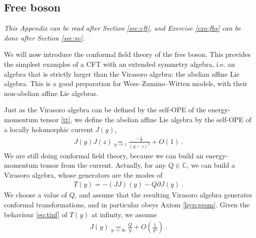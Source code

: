 \documentclass[12pt, a4paper]{article}
\theoremstyle{break}
\begin{document}
\subsection{Free boson}\label{sec:fb}

\textit{This Appendix can be read after Section \ref{sec:cft}, and Exercise \ref{exo:fbs} can be done after Section \ref{sec:sv}.}

\vspace{2mm}

We will now introduce the conformal field theory of the free boson. This provides the simplest examples of a CFT with an extended symmetry algebra, i.e. an algebra that is strictly larger than the Virasoro algebra: the abelian affine Lie algebra. This is a good preparation for Wess--Zumino--Witten models, with their non-abelian affine Lie algebras.

Just as the Virasoro algebra can be defined by the self-OPE of the energy-momentum tensor \eqref{tt}, we define the abelian affine Lie algebra by the self-OPE of a locally holomorphic current $J(y)$,
\begin{align}
 J(y)J(z) \underset{y\to z}{=} \frac{-\frac12}{(y-z)^2} + O(1)\ .
\label{jj}
\end{align}
We are still doing conformal field theory, because we can build an energy-momentum tensor from the current. Actually, for any $Q\in\mathbb{C}$, we can build a Virasoro algebra, whose generators are the modes of 
\begin{align}
 T(y) = -(JJ)(y) - Q\partial J(y)\ .
\label{tqz}
\end{align}
We choose a value of $Q$, and assume that the resulting Virasoro algebra generates conformal transformations, and in particular obeys Axiom \ref{hyp:geom}. Given the behaviour \eqref{eq:tinf} of $T(y)$ at infinity, we assume 
\begin{align}
 J(y)\underset{y\to\infty}{=}\frac{Q}{y} +O\left(\frac{1}{y^2}\right) \ .
 \label{eq:ji}
\end{align}
\end{document}

